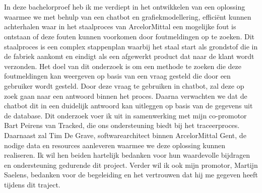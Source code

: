 
\chapter*{}%
\label{ch:voorwoord}

In deze bachelorproef heb ik me verdiept in het ontwikkelen van een oplossing waarmee we met behulp van een chatbot en grafiekmodellering, efficiënt kunnen achterhalen waar in het staalproces van ArcelorMittal een mogelijke fout is ontstaan of deze fouten kunnen voorkomen door foutmeldingen op te zoeken. 
Dit staalproces is een complex stappenplan waarbij het staal start als grondstof die in de fabriek aankomt en eindigt als een afgewerkt product dat naar de klant wordt verzonden.
Het doel van dit onderzoek is om een methode te zoeken die deze foutmeldingen kan weergeven op basis van een vraag gesteld die door een gebruiker wordt gesteld.
Door deze vraag te gebruiken in chatbot, zal deze op zoek gaan naar een antwoord binnen het proces. Daarna verwachten we dat de chatbot dit in een duidelijk antwoord kan uitleggen op basis van de gegevens uit de database.
Dit onderzoek voer ik uit in samenwerking met mijn co-promotor Bart Peirens van Tracked, die ons ondersteuning biedt bij het traceerproces. Daarnaast zal Tim De Grave, softwarearchitect binnen ArcelorMittal Gent, de nodige data en resources aanleveren waarmee we deze oplossing kunnen realiseren. 
Ik wil hen beiden hartelijk bedanken voor hun waardevolle bijdragen en ondersteuning gedurende dit project. Verder wil ik ook mijn promotor, Martijn Saelens, bedanken voor de begeleiding en het vertrouwen dat hij me gegeven heeft tijdens dit traject.
